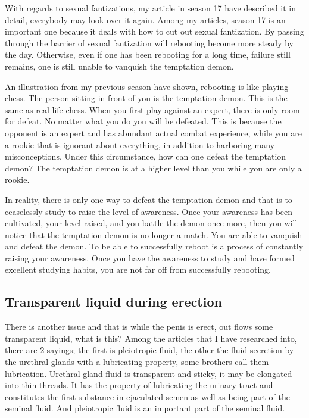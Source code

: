 \documentclass[
]{book}
\begin{document}
With regards to sexual fantizations, my article in season 17 have described it in detail, everybody may look over it again. Among my articles, season 17 is an important one because it deals with how to cut out sexual fantization. By passing through the barrier of sexual fantization will rebooting become more steady by the day. Otherwise, even if one has been rebooting for a long time, failure still remains, one is still unable to vanquish the temptation demon.

An illustration from my previous season have shown, rebooting is like playing chess. The person sitting in front of you is the temptation demon. This is the same as real life chess. When you first play against an expert, there is only room for defeat. No matter what you do you will be defeated. This is because the opponent is an expert and has abundant actual combat experience, while you are a rookie that is ignorant about everything, in addition to harboring many misconceptions. Under this circumstance, how can one defeat the temptation demon? The temptation demon is at a higher level than you while you are only a rookie.

In reality, there is only one way to defeat the temptation demon and that is to ceaselessly study to raise the level of awareness. Once your awareness has been cultivated, your level raised, and you battle the demon once more, then you will notice that the temptation demon is no longer a match. You are able to vanquish and defeat the demon. To be able to successfully reboot is a process of constantly raising your awareness. Once you have the awareness to study and have formed excellent studying habits, you are not far off from successfully rebooting.

\hypertarget{transparent-liquid-during-erection}{%
\subsection{Transparent liquid during erection}\label{transparent-liquid-during-erection}}

There is another issue and that is while the penis is erect, out flows some transparent liquid, what is this? Among the articles that I have researched into, there are 2 sayings; the first is pleiotropic fluid, the other the fluid secretion by the urethral glands with a lubricating property, some brothers call them lubrication. Urethral gland fluid is transparent and sticky, it may be elongated into thin threads. It has the property of lubricating the urinary tract and constitutes the first substance in ejaculated semen as well as being part of the seminal fluid. And pleiotropic fluid is an important part of the seminal fluid.
\end{document}
